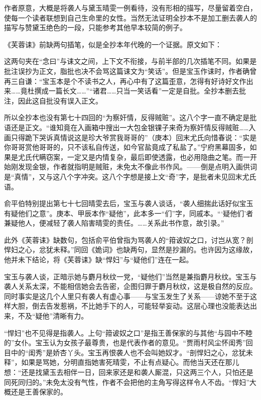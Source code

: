 \par 作者原意，大概是将袭人与黛玉晴雯一例看待，没有形相的描写，尽量留着空白，使每一个读者联想到自己生命里的女性。当然无法证明全抄本不是加工删去袭人的描写与赞黛玉绝色的一段，只能参考其他早本较简的例子。
\par 《芙蓉诔》前缺两句插笔，似是全抄本年代晚的一个证据。原文如下：
\par 这两句夹在“念曰”与诔文之间，上下文不衔接，与前半部的几次插笔不同。如果是批注误抄为正文，脂批也决不会骂这篇诔文为“笑话”。但是宝玉作诔时，作者确曾再三自谦：“宝玉本是个不读书之人，再心中有了这篇歪意，怎得有好诗好文作出来……竟杜撰成一篇长文……”“诸君……只当一笑话看”一定是自批。全抄本删去批注，因此这自批没有误入正文。
\par 所以全抄本也没有第七十四回的“为察奸情，反得贼赃”。这八个字一直不确定是批语还是正文。“谁知竟在入画箱中搜出一大包金银锞子来奇为察奸情反得贼赃……入画只得跪下哭诉真情说这是珍大爷赏我哥哥的”（庚本）回末尤氏向惜春说：“实是你哥哥赏他哥哥的，只不该私自传送，如今官盐竟成了私盐了。”宁府黑幕固多，如果是尤氏代瞒窃案，一定又是内情复杂，最后即使透露，也必用隐曲之笔。而一开始刚发现金银，作者就指明是贼赃，未免太不像此书作风。——倒是点明入画供词是“真情”，又与这八个字冲突。这八个字想是接上文“奇”字，是批者未见回末尤氏语。
\par 俞平伯特别提出第七十七回晴雯去后，宝玉与袭人谈话，“袭人细揣此话好似宝玉有疑他们之意”。庚本、甲辰本作“疑他”，此本多一“们”字，同戚本。“‘疑他们’者兼疑他人，便减轻了袭人陷害晴雯的责任。……关系此书作意，故引录。”
\par 此外《芙蓉诔》缺数句，包括俞平伯曾指为骂袭人的“箝诐奴之口，讨岂从宽？剖悍妇之心，忿犹未释。”同回《姽词》也缺两句，显然是抄漏的。也许因为这缘故，他并未下结论，将《芙蓉诔》缺“悍妇”与“疑他们”连在一起。
\par 宝玉与袭人谈，正暗示她与麝月秋纹一党，“疑他们”当然是兼指麝月秋纹。宝玉与袭人关系太深，不能相信她会去告密，企图归罪于麝月秋纹，这是极自然的反应。同时事实是这几个人里只有袭人有虚心事——与宝玉发生了关系——谅她不至于这样大胆，倒去告发惹祸，不比她手下的人，可能轻举妄动。这层心理也没能表达出来，不及“疑他”清晰有力。
\par “悍妇”也不见得是指袭人。上句“箝诐奴之口”是指王善保家的与其他“与园中不睦的”女仆。宝玉认为女孩子最尊贵，也是代表作者的意见。“贾雨村风尘怀闺秀”回目中的“闺秀”是娇杏丫头。宝玉再恨袭人也不会叫她奴才。“剖悍妇之心，忿犹未释”，如果是骂她，分明直指她害死晴雯，不止有点疑心。而他当天还在那儿想：“还是找黛玉去相伴一日，回来家还是和袭人厮混，只这两三个人，只怕还是同死同归的。”未免太没有气性，作者不会把他的主角写得这样令人不齿。“悍妇”大概还是王善保家的。
